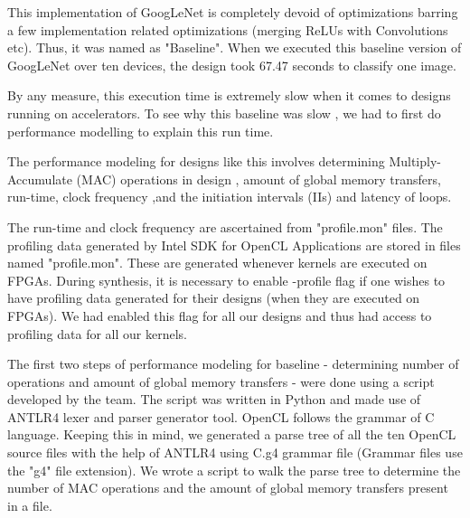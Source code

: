 This implementation of GoogLeNet is completely devoid of optimizations barring a few implementation related optimizations (merging ReLUs with Convolutions etc). Thus, it was named as "Baseline". When we executed this baseline version of GoogLeNet over ten devices, the design took 67.47 seconds to classify one image.  

By any measure, this execution time is extremely slow when it comes to designs running on accelerators. To see why this baseline was slow , we had to first do performance modelling to explain this run time.

The performance modeling for designs like this involves determining
  Multiply-Accumulate (MAC) operations in design , amount of global memory transfers, run-time, clock frequency ,and the initiation intervals (IIs) and latency of loops.

The run-time and clock frequency are ascertained from "profile.mon" files.   
The profiling data generated by Intel SDK for OpenCL Applications are stored in files named "profile.mon". These are generated whenever kernels are executed on FPGAs. During synthesis, it is necessary to enable -profile flag if one wishes to have profiling data generated for their designs (when they are executed on FPGAs). We had enabled this flag for all our designs and thus had access to profiling data for all our kernels.

The first two steps of performance modeling for baseline - determining number of operations and amount of global memory transfers - were done using a script developed by the team. The script was written in Python and made use of ANTLR4 lexer and parser generator tool. OpenCL follows the grammar of C language. Keeping this in mind, we generated a parse tree of all the ten OpenCL source files with the help of ANTLR4 using C.g4 grammar file (Grammar files use the "g4" file extension). We wrote a script to walk the parse tree to determine the number of MAC operations and the amount of global memory transfers present in a file.


